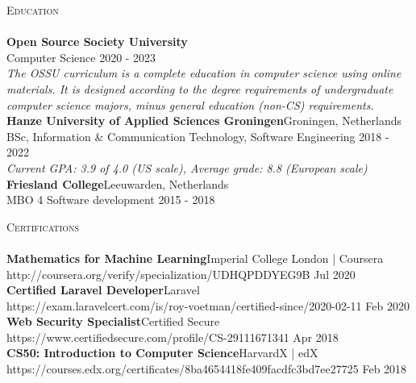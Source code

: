 \documentclass[a4paper]{article}
\newcommand{\lineunder} {
    \vspace*{-8pt} \\
    \hspace*{-18pt} \hrulefill \\
}
\newcommand{\header} [1] {
    {\hspace*{-18pt}\vspace*{6pt} \textsc{#1}}
    \vspace*{-6pt} \lineunder
}
\begin{document}
\header{Education}
\textbf{Open Source Society University}\\
Computer Science \hfill 2020 - 2023\\
\vspace{1mm}
\emph{The OSSU curriculum is a complete education in computer science using online materials. It is designed according to the degree requirements of undergraduate computer science majors, minus general education (non-CS) requirements.}\\
\vspace{2mm}
\textbf{Hanze University of Applied Sciences Groningen}\hfill Groningen, Netherlands\\
BSc, Information \& Communication Technology, Software Engineering \hfill 2018 - 2022\\
\vspace{1mm}
\emph{Current GPA: 3.9 of 4.0 (US scale), Average grade: 8.8 (European scale)}\\
\vspace{2mm}
\textbf{Friesland College}\hfill Leeuwarden, Netherlands\\
MBO 4 Software development \hfill 2015 - 2018\\
\vspace{2mm}

\newpage

\header{Certifications}
\textbf{Mathematics for Machine Learning}\hfill Imperial College London | Coursera\\
http://coursera.org/verify/specialization/UDHQPDDYEG9B \hfill Jul 2020\\
\vspace{2mm}
\textbf{Certified Laravel Developer}\hfill Laravel\\
https://exam.laravelcert.com/is/roy-voetman/certified-since/2020-02-11 \hfill Feb 2020\\
\vspace{2mm}
\textbf{Web Security Specialist}\hfill Certified Secure\\
https://www.certifiedsecure.com/profile/CS-29111671341 \hfill Apr 2018\\
\vspace{2mm}
\textbf{CS50: Introduction to Computer Science}\hfill HarvardX | edX\\
https://courses.edx.org/certificates/8ba4654418fe409facdfc3bd7ee27725 \hfill Feb 2018\\
\vspace{2mm}
\end{document}
